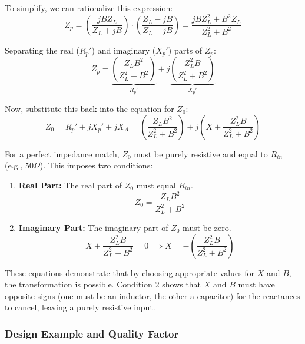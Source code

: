 To simplify, we can rationalize this expression:
$$Z_p = \left( \frac{jB Z_L}{Z_L + jB} \right) \cdot \left( \frac{Z_L - jB}{Z_L - jB} \right) = \frac{jB Z_L^2 + B^2 Z_L}{Z_L^2 + B^2}$$

Separating the real ($R_p'$) and imaginary ($X_p'$) parts of $Z_p$:
$$Z_p = \underbrace{\left( \frac{Z_L B^2}{Z_L^2 + B^2} \right)}_{R_p'} + j \underbrace{\left( \frac{Z_L^2 B}{Z_L^2 + B^2} \right)}_{X_p'}$$

Now, substitute this back into the equation for $Z_{0}$:
$$Z_{0} = R_p' + jX_p' + jX_A = \left( \frac{Z_L B^2}{Z_L^2 + B^2} \right) + j \left( X + \frac{Z_L^2 B}{Z_L^2 + B^2} \right)$$

For a perfect impedance match, $Z_{0}$ must be purely resistive and equal to $R_{in}$ (e.g., $50 \Omega$). This imposes two conditions:

\begin{enumerate}
    \item \textbf{Real Part:} The real part of $Z_{0}$ must equal $R_{in}$.
    $$Z_{0} = \frac{Z_L B^2}{Z_L^2 + B^2}$$

    \item \textbf{Imaginary Part:} The imaginary part of $Z_{0}$ must be zero.
    $$X + \frac{Z_L^2 B}{Z_L^2 + B^2} = 0 \implies X= - \left( \frac{Z_L^2 B}{Z_L^2 + B^2} \right)$$
\end{enumerate}

These equations demonstrate that by choosing appropriate values for $X$ and $B$, the transformation is possible. Condition 2 shows that $X$ and $B$ must have opposite signs (one must be an inductor, the other a capacitor) for the reactances to cancel, leaving a purely resistive input.

\subsubsection{Design Example and Quality Factor}

